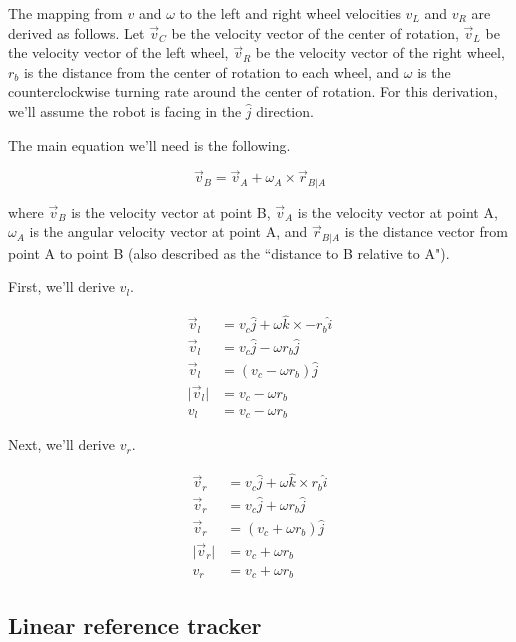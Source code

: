 The mapping from $v$ and $\omega$ to the left and right wheel velocities $v_L$
and $v_R$ are derived as follows. Let $\vec{v}_C$ be the velocity vector of the
center of rotation, $\vec{v}_L$ be the velocity vector of the left wheel,
$\vec{v}_R$ be the velocity vector of the right wheel, $r_b$ is the distance
from the center of rotation to each wheel, and $\omega$ is the counterclockwise
turning rate around the center of rotation. For this derivation, we'll assume
the robot is facing in the $\hat{j}$ direction.

The main equation we'll need is the following.

\begin{equation*}
  \vec{v}_B = \vec{v}_A + \omega_A \times \vec{r}_{B|A}
\end{equation*}

where $\vec{v}_B$ is the velocity vector at point B, $\vec{v}_A$ is the velocity
vector at point A, $\omega_A$ is the angular velocity vector at point A, and
$\vec{r}_{B|A}$ is the distance vector from point A to point B (also described
as the ``distance to B relative to A").

First, we'll derive $v_l$.

\begin{align}
  \vec{v}_l &= v_c \hat{j} + \omega \hat{k} \times -r_b \hat{i} \nonumber \\
  \vec{v}_l &= v_c \hat{j} - \omega r_b \hat{j} \nonumber \\
  \vec{v}_l &= (v_c - \omega r_b) \hat{j} \nonumber \\
  \lvert\vec{v}_l\rvert &= v_c - \omega r_b \nonumber \\
  v_l &= v_c - \omega r_b \label{eq:diff_vl}
\end{align}

Next, we'll derive $v_r$.

\begin{align}
  \vec{v}_r &= v_c \hat{j} + \omega \hat{k} \times r_b \hat{i} \nonumber
    \\
  \vec{v}_r &= v_c \hat{j} + \omega r_b \hat{j} \nonumber \\
  \vec{v}_r &= (v_c + \omega r_b) \hat{j} \nonumber \\
  \lvert\vec{v}_r\rvert &= v_c + \omega r_b \nonumber \\
  v_r &= v_c + \omega r_b \label{eq:diff_vr}
\end{align}

\subsection{Linear reference tracker}

